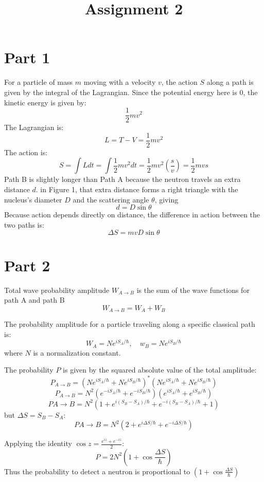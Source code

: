 \documentclass{article}
\title{Assignment 2}
\begin{document}
\maketitle

\section{Part 1}
For a particle of mass $m$ moving with a velocity $v$, the action $S$ along a path is given by the integral of the Lagrangian. Since the potential energy here is $0$, the kinetic energy is given by:
\[
  \frac{1}{2}mv^2
\]
The Lagrangian is:
\[
  L = T - V = \frac{1}{2}mv^2
\]
The action is:
\[
  S = \int L dt = \int \frac{1}{2}mv^2 dt = \frac{1}{2}mv^2 \left(\frac{s}{v}\right) = \frac{1}{2}mvs
\]
Path B is slightly longer than Path A because the neutron travels an extra distance $d$. in Figure 1, that extra distance forms a right triangle with the nucleus's diameter $D$ and the scattering angle $\theta$, giving 
\[
d = D \sin\theta
\]
Because action depends directly on distance, the difference in action between the two paths is:
\[
\Delta S = mvD \sin\theta
\]

\section{Part 2}

Total wave probability amplitude $W_{A\rightarrow B}$ is the sum of the wave functions for path A and path B
    \[
    W_{A\rightarrow B} = W_A + W_B
    \]
    
The probability amplitude for a particle traveling along a specific classical path is:
    \[
    W_A = N e^{iS_A/\hbar}, \quad w_B = N e^{iS_B/\hbar}
    \]
    where $N$ is a normalization constant.
    
The probability $P$ is given by the squared absolute value of the total amplitude:
    \[
    P_{A\rightarrow B} = \left( N e^{iS_A/\hbar} + N e^{iS_B/\hbar} \right)^* \left( N e^{iS_A/\hbar} + N e^{iS_B/\hbar} \right)
    \]
    \[
    P_{A\rightarrow B} = N^2 \left( e^{-iS_A/\hbar} + e^{-iS_B/\hbar} \right) \left( e^{iS_A/\hbar} + e^{iS_B/\hbar} \right)
    \]
    \[
    P{A\rightarrow B} = N^2 \left( 1 + e^{i(S_B - S_A)/\hbar} + e^{-i(S_B - S_A)/\hbar} + 1 \right)
    \]
    but $\Delta S = S_B - S_A$:
    \[
    P{A\rightarrow B} = N^2 \left( 2 + e^{i\Delta S/\hbar} + e^{-i\Delta S/\hbar} \right)
    \]
    
Applying the identity $\cos z = \frac{e^{iz} + e^{-iz}}{2}$:  
    \[
    P = 2N^2 \left( 1 + \cos\frac{\Delta S}{\hbar} \right)
    \]
    Thus the probability to detect a neutron is proportional to $(1 + \cos \frac{\Delta S}{\hbar})$
\end{document}
